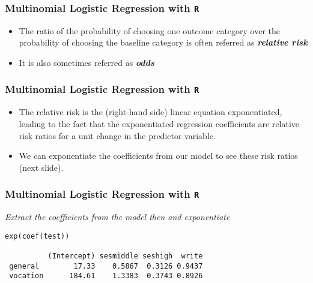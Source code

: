 \documentclass[00-GLMregslides.tex]{subfiles}
\begin{document}
	


\begin{frame}[fragile]

\frametitle{Multinomial Logistic Regression with \texttt{R}}
\Large
\begin{itemize}
\item The ratio of the probability of choosing one outcome category over the probability of choosing the baseline category is often referred as 
\textbf{\textit{relative risk}} 
\item It is also sometimes referred as \textbf{\textit{odds}}

\end{itemize}
\end{frame}
\begin{frame}[fragile]
\frametitle{Multinomial Logistic Regression with \texttt{R}}	\Large
	\begin{itemize}
\item  The relative risk is the (right-hand side) linear equation exponentiated, leading to the fact that the 
exponentiated regression coefficients are relative risk ratios for a unit change in the predictor variable. 
\item  We can exponentiate the coefficients from our model to see these risk ratios (next slide). 
\end{itemize}
\end{frame}
\begin{frame}[fragile]

\frametitle{Multinomial Logistic Regression with \texttt{R}}
\large

\textit{Extract the coefficients from the model then and exponentiate}
\begin{framed}
\begin{verbatim}
exp(coef(test))
 
          (Intercept) sesmiddle seshigh  write
 general        17.33    0.5867  0.3126 0.9437
 vocation      184.61    1.3383  0.3743 0.8926
\end{verbatim}
\end{framed}
\end{frame}
\end{document}
